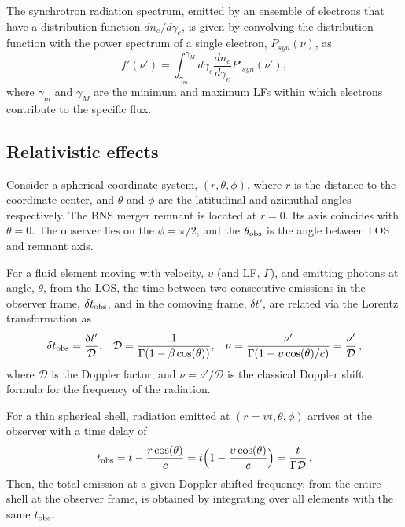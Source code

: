 The synchrotron radiation spectrum, emitted by an ensemble of electrons that have a 
distribution function $dn_e/d\gamma_e$, 
is given by convolving the distribution function with the power spectrum of a single 
electron, $P_{syn}(\nu)$, as 
%
\begin{equation}
f'(\nu') = \int_{\gamma_{m}}^{\gamma_M} d\gamma_e \frac{dn_e}{d\gamma_e}P'_{syn}(\nu'), 
\label{eq:afterglow:sync_power}
\end{equation}
%
where $\gamma_{m}$ and $\gamma_M$ are the minimum and maximum \acp{LF} 
within which electrons contribute to the specific flux.


\subsection{Relativistic effects}

Consider a spherical coordinate system, $(r,\theta,\phi)$, where 
$r$ is the distance to the coordinate center, and $\theta$ and $\phi$ 
are the latitudinal and azimuthal angles respectively. 
The \ac{BNS} merger remnant is located at $r=0$. 
Its axis coincides with $\theta = 0$. 
The observer lies on the $\phi = \pi / 2$, and the $\theta_{\rm obs}$ is 
the angle between \ac{LOS} and remnant axis. 

For a fluid element moving with velocity, $\upsilon$ (and \ac{LF}, $\Gamma$), 
and emitting photons at angle, $\theta$, from the \ac{LOS}, the time between 
two consecutive emissions in the observer frame, $\delta t_{\rm obs}$, 
and in the comoving frame, $\delta t'$, are related via the Lorentz transformation as 
%
\begin{equation}
\delta t_{\rm obs} = \frac{\delta t'}{\mathcal{D}}, \hspace{3mm}
\mathcal{D} = \frac{1}{\Gamma(1 - \beta\cos(\theta))}, \hspace{3mm}
\nu = \frac{\nu'}{\Gamma (1 - \upsilon\cos(\theta)/c)} = \frac{\nu'} {\mathcal{D}}\, ,
\label{eq:afterglow:dop_fac}
\end{equation}
%
where $\mathcal{D}$ is the Doppler factor, and $\nu=\nu'/\mathcal{D}$ is the 
classical Doppler shift formula for the frequency of the radiation.


For a thin spherical shell, radiation emitted at $(r=\upsilon t,\theta,\phi)$ 
arrives at the observer with a time delay
of
%
\begin{equation}
t_{\rm obs} = t - \frac{r \cos(\theta)}{c} = t\Big(1-\frac{\upsilon\cos(\theta)}{c}\Big) = \frac{t}{\Gamma\mathcal{D}}\, .
\label{eq:afterglow:tobs}
\end{equation}
%
Then, the total emission at a given Doppler shifted frequency, from the entire 
shell at the observer frame, is obtained by integrating over all elements with the 
same $t_{\rm obs}$.

